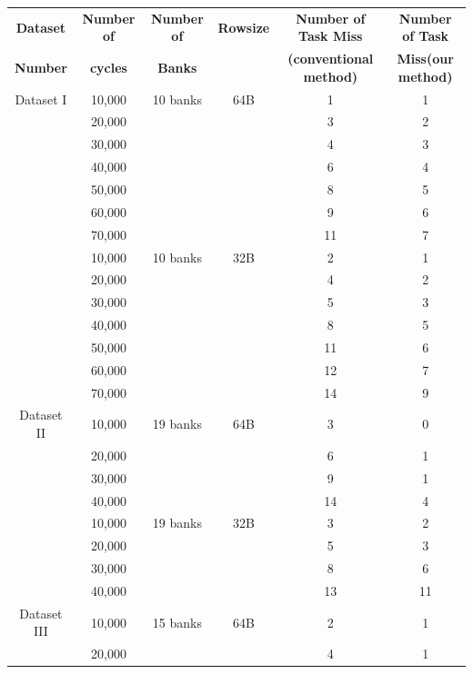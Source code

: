 \begin{table}
\centering
 \begin{tabular}{|c|c|c|c|c|c|}\hline
 {\bf Dataset} & {\bf Number of} & {\bf Number of} & {\bf Rowsize} & {\bf Number of Task Miss} & {\bf Number of Task}\\
 {\bf Number}  &  {\bf cycles} & {\bf Banks} & & {\bf (conventional method)}& {\bf Miss(our method)}\\ \hline
 Dataset I & 10,000 & 10 banks & 64B & 1 & 1 \\
           & 20,000 &          &     & 3 & 2 \\
           &30,000 &          &      & 4 & 3 \\
           &40,000 &          &      & 6 & 4 \\
           & 50,000 &        &       & 8 & 5 \\
           & 60,000 &        &      & 9 & 6 \\
           & 70,000 &        &      & 11 & 7 \\ \hline
           & 10,000 & 10 banks & 32B & 2 & 1 \\ 
           & 20,000 &        &       & 4 & 2 \\
           & 30,000 &        &       & 5 & 3 \\
           & 40,000 &        &       & 8 & 5 \\
           & 50,000 &        &       & 11 & 6 \\
           & 60,000 &        &       & 12 & 7 \\
           & 70,000 &        &       & 14 & 9 \\ \hline
 Dataset II & 10,000 & 19 banks & 64B & 3 & 0 \\
            & 20,000 &         &      & 6 & 1 \\
            & 30,000 &         &      & 9 & 1 \\
            & 40,000 &         &      & 14 & 4 \\ \hline
            & 10,000 & 19 banks & 32B & 3 & 2 \\
            & 20,000 &          &     & 5 & 3 \\
            & 30,000 &          &     & 8 & 6 \\
            & 40,000 &          &     & 13 & 11 \\ \hline
 Dataset III & 10,000 & 15 banks & 64B & 2 & 1 \\
             & 20,000 &          &     & 4 & 1 \\

\end{tabular}
\end{table}
